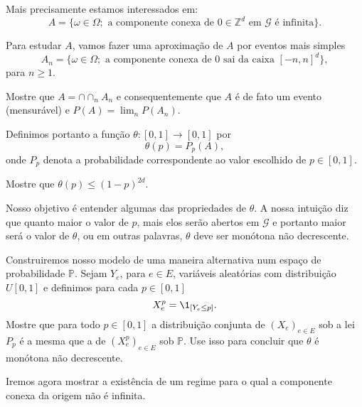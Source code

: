 \begin{topics}
Mais precisamente estamos interessados em:
\begin{equation}
  A = \big\{\omega \in \Omega; \text{ a componente conexa de $0 \in \mathbb{Z}^d$ em $\mathcal{G}$ é infinita} \big\}.
\end{equation}

Para estudar $A$, vamos fazer uma aproximação de $A$ por eventos mais simples
\begin{equation}
  A_n = \big\{ \omega \in \Omega; \text{ a componente conexa de $0$ sai da caixa $[-n, n]^d$}\},
\end{equation}
para $n \geq 1$.

\begin{exercise}
  Mostre que $A = \cap \cap_n A_n$ e consequentemente que $A$ é de fato um evento (mensurável) e $P(A) = \lim_n P(A_n)$.
\end{exercise}

Definimos portanto a função $\theta:[0,1] \to [0,1]$ por
\begin{equation}
  \theta(p) = P_p(A),
\end{equation}
onde $P_p$ denota a probabilidade correspondente ao valor escolhido de $p \in [0,1]$.

\begin{exercise}
  Mostre que $\theta(p) \leq (1-p)^{2d}$.
\end{exercise}

Nosso objetivo é entender algumas das propriedades de $\theta$.
A nossa intuição diz que quanto maior o valor de $p$, mais elos serão abertos em $\mathcal{G}$ e portanto maior será o valor de $\theta$, ou em outras palavras, $\theta$ deve ser monótona não decrescente.

\begin{exercise}
  Construiremos nosso modelo de uma maneira alternativa num espaço de probabilidade $\mathbb{P}$.
  Sejam $Y_e$, para $e \in E$, variáveis aleatórias \iid com distribuição $U[0,1]$ e definimos para cada $p \in [0,1]$
  \begin{equation}
    X^p_e = \1_{[Y_e \leq p]}.
  \end{equation}
  Mostre que para todo $p \in [0,1]$ a distribuição conjunta de $(X_e)_{e \in E}$ sob a lei $P_p$ é a mesma que a de $(X^p_e)_{e \in E}$ sob $\mathbb{P}$.
  Use isso para concluir que $\theta$ é monótona não decrescente.
\end{exercise}

Iremos agora mostrar a existência de um regime para o qual a componente conexa da origem não é infinita.


\end{topics}
